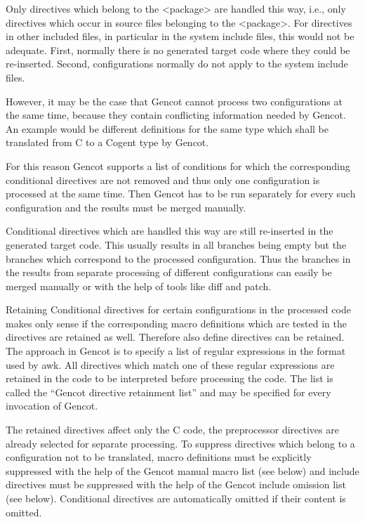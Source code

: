 Only directives which belong to the <package> are handled this way, i.e., only directives which occur in source
files belonging to the <package>. For directives in other included files, in particular in the system include files,
this would not be adequate. First, normally there is no generated target code where they could be re-inserted.
Second, configurations normally do not apply to the system include files.

However, it may be the case that Gencot cannot process two configurations at the same time, because they contain
conflicting information needed by Gencot. An example would be different definitions for the same type which
shall be translated from C to a Cogent type by Gencot.

For this reason Gencot supports a list of conditions for which the corresponding conditional directives are not 
removed and thus only one configuration is processed at the same time. Then Gencot has to be run separately for every
such configuration and the results must be merged manually.

Conditional directives which are handled this way are still re-inserted in the generated target code. This
usually results in all branches being empty but the branches which correspond to the processed configuration.
Thus the branches in the results from separate processing of different configurations can easily be merged manually
or with the help of tools like diff and patch.

Retaining Conditional directives for certain configurations in the processed code makes only sense if the corresponding
macro definitions which are tested in the directives are retained as well. Therefore also define directives can be
retained. The approach in Gencot is to specify a list of regular expressions in the format used by awk. All directives
which match one of these regular expressions are retained in the code to be interpreted before processing the code.
The list is called the ``Gencot directive retainment list'' and may be specified for every invocation of Gencot.

The retained directives affect only the C code, the preprocessor directives are already selected for separate processing.
To suppress directives which belong to a configuration not to be translated, macro definitions must be explicitly
suppressed with the help of the Gencot manual macro list (see below) and include directives must be suppressed
with the help of the Gencot include omission list (see below). Conditional directives are automatically omitted
if their content is omitted.

